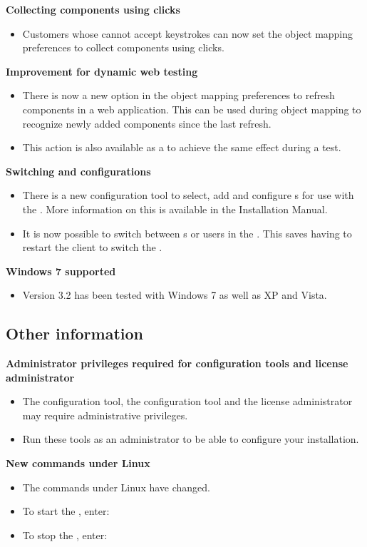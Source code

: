 \textbf{Collecting components using clicks}
\begin{itemize}
\item Customers whose \gdauts{} cannot accept keystrokes can now set the object mapping preferences to collect components using clicks. 
\end{itemize}
\textbf{Improvement for dynamic web testing}
\begin{itemize}
\item There is  now a new option in the object mapping preferences to refresh components in a web application. This can be used during object mapping to recognize newly added components since the last refresh.
\item This action is also available as a \gdstep{} to achieve the same effect during a test. 
\end{itemize}
\textbf{Switching \gddb{} and \gddb{} configurations}
\begin{itemize}
\item There is a new \gddb{} configuration tool to select, add and configure \gddb{}s for use with the \ite{}. More information on this is available in the Installation Manual.
\item It is now possible to switch between \gddb{}s or \gddb{} users in the \ite{}. This saves having to restart the client to switch the \gddb{}. 
\end{itemize}

\textbf{Windows 7 supported}
\begin{itemize}
\item Version 3.2 has been tested with Windows 7 as well as XP and Vista. 
\end{itemize}

\subsection{Other information}

\textbf{Administrator privileges required for configuration tools and license administrator}
\begin{itemize}
\item The configuration tool, the \gddb{} configuration tool and the license administrator may require administrative privileges. 
\item Run these tools as an administrator to be able to configure your installation. 
\end{itemize}

\textbf{New \gdagent{} commands under Linux}
\begin{itemize}
\item The \gdagent{} commands under Linux have changed. 
\item To start the \gdagent{}, enter: 
\item To stop the \gdagent{}, enter: 
\end{itemize}

